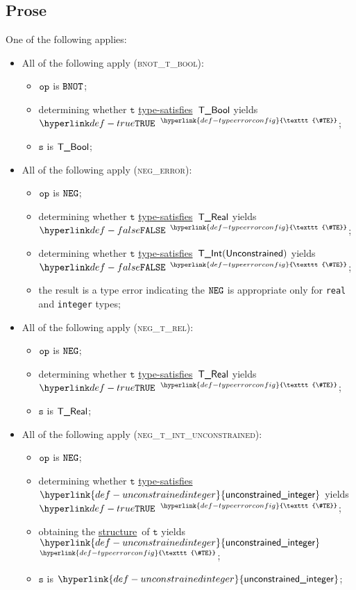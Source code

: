 \documentclass{book}
\newcommand\TypeErrorConfig[0]{\hyperlink{def-typeerrorconfig}{\texttt{\#TE}}}
\newcommand\ProseOrTypeError[0]{\hyperlink{def-proseortypeerror}{$^{\TypeErrorConfig}$}}
\newcommand\unconstrainedinteger[0]{\hyperlink{def-unconstrainedinteger}{\textsf{unconstrained\_integer}}}
\newcommand\structure[0]{\hyperlink{def-structure}{structure}}
\newcommand\typesatisfies[0]{\hyperlink{def-typesatisfies}{type-satisfies}}
\newcommand\vt[0]{\texttt{t}}
\newcommand\vs[0]{\texttt{s}}
\begin{document}
\subsection{Prose}
One of the following applies:
\begin{itemize}
\item All of the following apply (\textsc{bnot\_t\_bool}):
  \begin{itemize}
    \item $\texttt{op}$ is $\texttt{BNOT}$;
    \item determining whether $\vt$ \typesatisfies\ $\textsf{T\_Bool}$ yields $\True$ \ProseOrTypeError;
    \item $\vs$ is $\textsf{T\_Bool}$;
  \end{itemize}

\item All of the following apply (\textsc{neg\_error}):
\begin{itemize}
  \item $\texttt{op}$ is $\texttt{NEG}$;
  \item determining whether $\vt$ \typesatisfies\ $\textsf{T\_Real}$ yields $\False$ \ProseOrTypeError;
  \item determining whether $\vt$ \typesatisfies\ $\textsf{T\_Int}(\textsf{Unconstrained})$ yields $\False$ \ProseOrTypeError;
  \item the result is a type error indicating the $\texttt{NEG}$ is appropriate only for \texttt{real} and \texttt{integer} types;
\end{itemize}

\item All of the following apply (\textsc{neg\_t\_rel}):
\begin{itemize}
  \item $\texttt{op}$ is $\texttt{NEG}$;
  \item determining whether $\vt$ \typesatisfies\ $\textsf{T\_Real}$ yields $\True$ \ProseOrTypeError;
  \item $\vs$ is $\textsf{T\_Real}$;
\end{itemize}

\item All of the following apply (\textsc{neg\_t\_int\_unconstrained}):
\begin{itemize}
  \item $\texttt{op}$ is $\texttt{NEG}$;
  \item determining whether $\vt$ \typesatisfies\ $\unconstrainedinteger$ yields $\True$ \ProseOrTypeError;
  \item obtaining the \structure\ of $\vt$ yields $\unconstrainedinteger$ \ProseOrTypeError;
  \item $\vs$ is $\unconstrainedinteger$;
\end{itemize}


\end{itemize}
\end{document}
